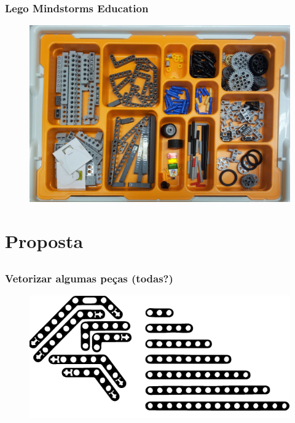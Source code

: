 \documentclass{beamer}
\begin{document}
\begin{frame}
\frametitle{Lego Mindstorms	Education}
\begin{figure}[htp]
\begin{center}
  \includegraphics[width=\linewidth]{imagens/pecas-002.jpg}
\end{center}
\end{figure}
\end{frame}

\section{Proposta}
\subsection{}

\begin{frame}
\frametitle{Vetorizar algumas peças (todas?)}
\begin{figure}[htp]
\begin{center}
  \includegraphics[width=\linewidth]{imagens/pecas-004.jpg}
\end{center}
\end{figure}
\end{frame}
\end{document}
